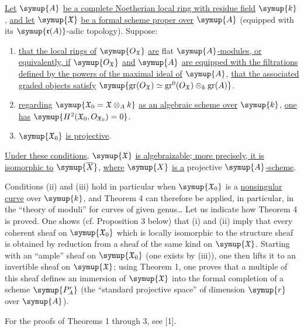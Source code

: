  \uline{Let} $\symup{A}$ \uline{be a complete Noetherian local ring with residue
field} $\symup{k}$, \uline{and let} $\symup{\mathfrak X}$ \uline{be a formal scheme proper over} $\symup{A}$ (equipped
with its $\symup{\mathfrak r(A)}$-adic topology). Suppose:
\begin{enumerate}
  \item[\textnormal{i.}] \uline{that the local rings of} $\symup{O_{\mathfrak X}}$ \uline{are} flat
    $\symup{A}$\uline{-modules, or equivalently, if} $\symup{O_{\mathfrak X}}$ \uline{and} $\symup{A}$ \uline{are equipped
    with the filtrations defined by the powers of the maximal ideal of} $\symup{A}$,
    \uline{that the associated graded objects satisfy}
    $\symup{\operatorname{gr}(O_{\mathfrak X})\simeq
      \operatorname{gr}^{0}(O_{\mathfrak X})\otimes_k\operatorname{gr}(A)}$.
  \item[\textnormal{ii.}] \uline{regarding}
    $\symup{\mathfrak X_0=\mathfrak X\otimes_A k}$ \uline{as an algebraic scheme over} $\symup{k}$, \uline{one
    has}
    $\symup{H^2(\mathfrak X_0,O_{\mathfrak X_0})=0}$.
  \item[\textnormal{iii.}] $\symup{\mathfrak X_0}$ \uline{is projective}.
\end{enumerate}
\uline{Under these conditions}, $\symup{\mathfrak X}$ \uline{is algebraizable; more precisely, it is
isomorphic to} $\symup{\overline X}$, \uline{where} $\symup{X}$ \uline{is a} projective $\symup{A}$\uline{-scheme}.

Conditions (ii) and (iii) hold in particular when
$\symup{\mathfrak X_0}$ is a \uline{nonsingular curve} over $\symup{k}$, and Theorem 4 can therefore
be applied, in particular, in the “theory of moduli” for curves of given
genus\ldots{} Let us indicate how Theorem 4 is proved. One shows (cf.
Proposition 3 below) that (i) and (ii) imply that every
coherent sheaf on $\symup{\mathfrak X_0}$ which is locally isomorphic to the structure
sheaf is obtained by reduction from a sheaf of the same kind on
$\symup{\mathfrak X}$. Starting with an “ample” sheaf on $\symup{\mathfrak X_0}$ (one exists
by (iii)), one then lifts it to an invertible sheaf on $\symup{\mathfrak X}$;
using Theorem 1, one proves that a multiple of this sheaf defines an immersion
of $\symup{\mathfrak X}$ into the formal completion of a scheme $\symup{P_A^r}$ (the
“standard projective space” of dimension $\symup{r}$ over $\symup{A}$).

For the proofs of Theorems 1 through 3, see [1].


